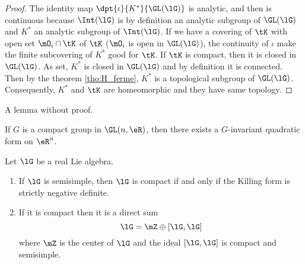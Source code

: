 \begin{proof}
The identity map $\dpt{\iota}{K^*}{\GL(\lG)}$ is analytic, and then is continuous because $\Int(\lG)$ is by definition an analytic subgroup of $\GL(\lG)$ and $K^*$ an analytic subgroup of $\Int(\lG)$. If we have a covering of $\tK$ with open set $\mO_i\cap\tK$ of $\tK$ ($\mO_i$ is open in $\GL(\lG)$), the continuity of $\iota$ make the finite subcovering of $K^*$ good for $\tK$.
If $\tK$ is compact, then it is closed in $\GL(\lG)$. As set, $K^*$ is closed in $\GL(\lG)$ and by definition it is connected. Then by the theorem \ref{tho:H_ferme}, $K^*$ is a topological subgroup of $\GL(\lG)$. Consequently, $K^*$ and $\tK$ are homeomorphic and they have same topology.
\end{proof}

A lemma without proof.
\begin{lemma}
If $G$ is a compact group in $\GL(n,\eR)$, then there exists a $G$-invariant quadratic form on $\eR^n$.
\end{lemma}

\begin{proposition}     \label{ProplGcompactKillNeg}
Let $\lG$ be a real Lie algebra.

\begin{enumerate}
\item If $\lG$ is semisimple, then $\lG$ is compact if and only if  the Killing form is strictly negative definite.
\item If it is compact then it is a direct sum
\begin{equation}
   \lG=\mZ\oplus [\lG,\lG]
\end{equation}
where $\mZ$ is the center of $\lG$ and the ideal $[\lG,\lG]$ is compact and semisimple.
\end{enumerate}
\label{prop:compact_Killing}
\end{proposition}


